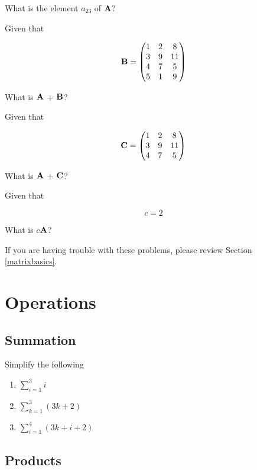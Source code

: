 \documentclass[
]{book}
\theoremstyle{definition}
\theoremstyle{definition}
\theoremstyle{definition}
\theoremstyle{remark}
\begin{document}
What is the element \(a_{23}\) of \({\bf A}\)?

Given that

\[{\bf B}=\begin{pmatrix}
            1 & 2 & 8 \\
            3 & 9 & 11 \\ 
            4 & 7 & 5 \\ 
            5 & 1 & 9
        \end{pmatrix}\]

What is \({\bf A}\) + \({\bf B}\)?

Given that

\[{\bf C}=\begin{pmatrix}
            1 & 2 & 8 \\
            3 & 9 & 11 \\ 
            4 & 7 & 5 \\ 
        \end{pmatrix}\]

What is \({\bf A}\) + \({\bf C}\)?

Given that

\[c = 2\]

What is \(c\)\({\bf A}\)?

If you are having trouble with these problems, please review Section \ref{matrixbasics}.

\hypertarget{operations}{%
\section*{Operations}\label{operations}}

\hypertarget{summation}{%
\subsection*{Summation}\label{summation}}

Simplify the following

\begin{enumerate}
\def\labelenumi{\arabic{enumi}.}
\item
  \(\sum\limits_{i = 1}^3 i\)
\item
  \(\sum\limits_{k = 1}^3(3k + 2)\)
\item
  \(\sum\limits_{i= 1}^4 (3k + i + 2)\)
\end{enumerate}

\hypertarget{products}{%
\subsection*{Products}\label{products}}
\end{document}
